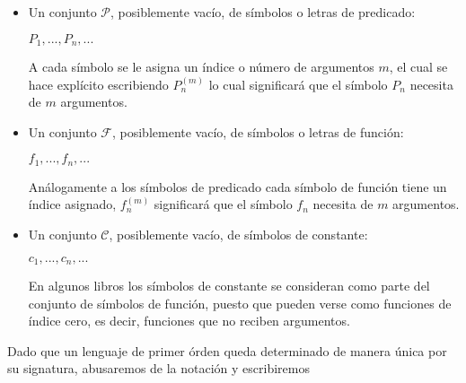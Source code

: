 \documentclass[letterpaper,11pt]{article}
\begin{document}
\begin{enumerate}
\begin{itemize}
\begin{itemize}
                \begin{itemize}
                    \item Un conjunto $\mathcal{P}$, posiblemente vacío, de
                    símbolos o letras de predicado:
                    
                    \begin{center}
                        $P_{1}, ..., P_{n}, ...$
                    \end{center}

                    A cada símbolo se le asigna un índice o número de argumentos 
                    $m$, el cual se hace explícito escribiendo $P_{n}^{(m)}$ lo 
                    cual significará que el símbolo $P_{n}$ necesita de $m$ 
                    argumentos.
                    \item Un conjunto $\mathcal{F}$, posiblemente vacío, de
                    símbolos o letras de función:
                    
                    \begin{center}
                        $f_{1},..., f_{n},...$
                    \end{center}

                    Análogamente a los símbolos de predicado cada símbolo de 
                    función tiene un índice asignado, $f_{n}^{(m)}$ significará 
                    que el símbolo $f_{n}$ necesita de $m$ argumentos.       
                    \item Un conjunto $\mathcal{C}$, posiblemente vacío, de 
                    símbolos de constante:
                    
                    \begin{center}
                        $c_{1}, ..., c_{n}, ...$
                    \end{center}

                    En algunos libros los símbolos de constante se consideran 
                    como parte del conjunto de símbolos de función, puesto que 
                    pueden verse como funciones de índice cero, es decir, 
                    funciones que no reciben argumentos.
                \end{itemize}

                \newpage
                Dado que un lenguaje de primer órden queda determinado de manera única
                por su signatura, abusaremos de la notación y escribiremos
                

\end{itemize}
\end{itemize}
\end{enumerate}
\end{document}
